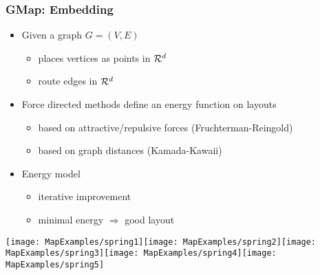 \documentclass{beamer}
\begin{document}
\begin{frame}[plain]\frametitle{GMap: Embedding}

\begin{itemize}
\item Given a graph $G=(V,E)$
\begin{itemize}
\item places vertices as points in ${\cal R}^d$
\item route edges in ${\cal R}^d$
\end{itemize}
\item Force directed methods define an energy function on layouts
\begin{itemize}
\item based on attractive/repulsive forces (Fruchterman-Reingold)
\item based on graph distances (Kamada-Kawaii)
\end{itemize}
\item Energy model
\begin{itemize}
\item iterative improvement
\item minimal energy $\Rightarrow$ good layout
\end{itemize}
\end{itemize}
\vspace{.4cm}
\begin{center}\texttt{[image: MapExamples/spring1]}\texttt{[image: MapExamples/spring2]}\texttt{[image: MapExamples/spring3]}\texttt{[image: MapExamples/spring4]}\texttt{[image: MapExamples/spring5]}\end{center}
\end{frame}


\begin{comment}
\begin{frame}[plain]\frametitle{GMap: Embedding, cont.}
\vspace{.1cm}
\begin{block}{Demo}{Force-directed algorithms in action!}\end{block}

\vspace{1cm}

\begin{center}\texttt{[image: MapExamples/spring1]}\texttt{[image: MapExamples/spring2]}\texttt{[image: MapExamples/spring3]}\texttt{[image: MapExamples/spring4]}\texttt{[image: MapExamples/spring5]}\end{center}
\end{frame}
\end{comment}
\end{document}
